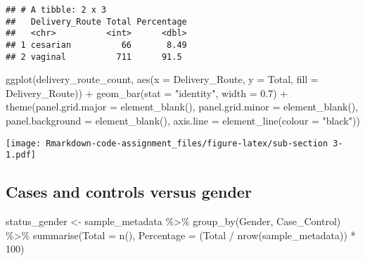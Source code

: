 \documentclass[
]{article}
\newenvironment{Shaded}{\begin{snugshade}}{\end{snugshade}}
\newcommand{\AttributeTok}[1]{\textcolor[rgb]{0.77,0.63,0.00}{#1}}
\newcommand{\DecValTok}[1]{\textcolor[rgb]{0.00,0.00,0.81}{#1}}
\newcommand{\FloatTok}[1]{\textcolor[rgb]{0.00,0.00,0.81}{#1}}
\newcommand{\FunctionTok}[1]{\textcolor[rgb]{0.00,0.00,0.00}{#1}}
\newcommand{\NormalTok}[1]{#1}
\newcommand{\OtherTok}[1]{\textcolor[rgb]{0.56,0.35,0.01}{#1}}
\newcommand{\SpecialCharTok}[1]{\textcolor[rgb]{0.00,0.00,0.00}{#1}}
\newcommand{\StringTok}[1]{\textcolor[rgb]{0.31,0.60,0.02}{#1}}
\begin{document}
\begin{verbatim}
## # A tibble: 2 x 3
##   Delivery_Route Total Percentage
##   <chr>          <int>      <dbl>
## 1 cesarian          66       8.49
## 2 vaginal          711      91.5
\end{verbatim}

\begin{Shaded}
\begin{Highlighting}[]
\FunctionTok{ggplot}\NormalTok{(delivery\_route\_count, }\FunctionTok{aes}\NormalTok{(}\AttributeTok{x =}\NormalTok{ Delivery\_Route, }\AttributeTok{y =}\NormalTok{ Total, }\AttributeTok{fill =}\NormalTok{ Delivery\_Route)) }\SpecialCharTok{+} 
  \FunctionTok{geom\_bar}\NormalTok{(}\AttributeTok{stat =} \StringTok{"identity"}\NormalTok{, }\AttributeTok{width =} \FloatTok{0.7}\NormalTok{) }\SpecialCharTok{+} 
  \FunctionTok{theme}\NormalTok{(}\AttributeTok{panel.grid.major =} \FunctionTok{element\_blank}\NormalTok{(), }\AttributeTok{panel.grid.minor =} \FunctionTok{element\_blank}\NormalTok{(),}
        \AttributeTok{panel.background =} \FunctionTok{element\_blank}\NormalTok{(), }\AttributeTok{axis.line =} \FunctionTok{element\_line}\NormalTok{(}\AttributeTok{colour =} \StringTok{"black"}\NormalTok{))}
\end{Highlighting}
\end{Shaded}

\texttt{[image: Rmarkdown-code-assignment\_files/figure-latex/sub-section 3-1.pdf]}

\hypertarget{cases-and-controls-versus-gender}{%
\subsection{Cases and controls versus
gender}\label{cases-and-controls-versus-gender}}

\begin{Shaded}
\begin{Highlighting}[]
\NormalTok{status\_gender }\OtherTok{\textless{}{-}}\NormalTok{ sample\_metadata }\SpecialCharTok{\%\textgreater{}\%} 
  \FunctionTok{group\_by}\NormalTok{(Gender, Case\_Control) }\SpecialCharTok{\%\textgreater{}\%} 
  \FunctionTok{summarise}\NormalTok{(}\AttributeTok{Total =} \FunctionTok{n}\NormalTok{(), }\AttributeTok{Percentage =}\NormalTok{ (Total }\SpecialCharTok{/} \FunctionTok{nrow}\NormalTok{(sample\_metadata)) }\SpecialCharTok{*} \DecValTok{100}\NormalTok{)}
\end{Highlighting}
\end{Shaded}
\end{document}
